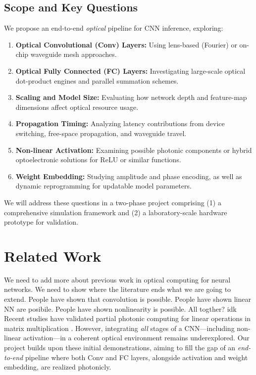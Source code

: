 \documentclass[conference]{IEEEtran}
\begin{document}
\subsection{Scope and Key Questions}
We propose an end-to-end \emph{optical} pipeline for CNN inference, exploring:
\begin{enumerate}
    \item \textbf{Optical Convolutional (Conv) Layers:} Using lens-based (Fourier) or on-chip waveguide mesh approaches.
    \item \textbf{Optical Fully Connected (FC) Layers:} Investigating large-scale optical dot-product engines and parallel summation schemes.
    \item \textbf{Scaling and Model Size:} Evaluating how network depth and feature-map dimensions affect optical resource usage.
    \item \textbf{Propagation Timing:} Analyzing latency contributions from device switching, free-space propagation, and waveguide travel.
    \item \textbf{Non-linear Activation:} Examining possible photonic components or hybrid optoelectronic solutions for ReLU or similar functions.
    \item \textbf{Weight Embedding:} Studying amplitude and phase encoding, as well as dynamic reprogramming for updatable model parameters.
\end{enumerate}

We will address these questions in a two-phase project comprising (1) a comprehensive simulation framework and (2) a laboratory-scale hardware prototype for validation.

\section{Related Work}
We need to add more about previous work in optical computing for neural networks. We need to show where the literature ends what we are going to extend. People have shown that convolution is possible. People have shown linear NN are posibile. People have shown nonlinearity is possible. All togther? idk
\\
Recent studies have validated partial photonic computing for linear operations in matrix multiplication \cite{ref:shen2017deep, ref:harris2018linear}. However, integrating \emph{all} stages of a CNN—including non-linear activation—in a coherent optical environment remains underexplored. Our project builds upon these initial demonstrations, aiming to fill the gap of an \emph{end-to-end} pipeline where both Conv and FC layers, alongside activation and weight embedding, are realized photonicly.
\end{document}

